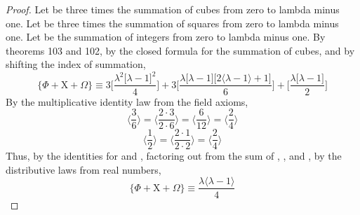 \documentclass[preview]{standalone}
\begin{document}
\begin{proof}
    Let \bm{$\Phi$} be three times the summation of cubes from zero to lambda minus one.
    Let  be three times the summation of squares from zero to lambda minus one.
    Let \bm{$\Omega$} be the summation of integers from zero to lambda minus one.
    By theorems 103 and 102, 
    by the closed formula for the summation of cubes,
    and by shifting the index of summation,
    \begin{equation*}
        \Bigg \{
            \Phi + \mathrm{X} + \Omega
        \Bigg \}
            \equiv
        3
        \Bigg[
            \frac{
                \lambda ^2
                \big[ \lambda - 1 \big] ^2
            }
            {4}
        \Bigg]
            +
        3
        \Bigg[
            \frac{
                \lambda 
                \big[ \lambda - 1 \big]
                \big[ 2 \langle \lambda - 1 \rangle + 1 \big]
            }
            {6}
        \Bigg]
            +
        \Bigg[
            \frac{\lambda \big [ \lambda - 1 ]}
            {2}
        \Bigg]
    \end{equation*} 
    By the multiplicative identity law from the field axioms,
    \begin{equation*}
        \bigg \langle 
            \frac{3}{6}
        \bigg \rangle
             = 
        \bigg \langle
            \frac{2 \cdot 3}{2 \cdot 6} 
        \bigg \rangle 
            = 
        \bigg \langle
            \frac{6}{12} 
        \bigg \rangle 
            = 
        \bigg \langle
            \frac{2}{4}
        \bigg \rangle
    \end{equation*}
    \begin{equation*}
        \bigg \langle 
            \frac{1}{2}
        \bigg \rangle
            =
        \bigg \langle
            \frac{2 \cdot 1}{2 \cdot 2}
        \bigg \rangle
            =
        \bigg \langle 
            \frac{2}{4}
        \bigg \rangle
    \end{equation*}
    Thus, by the identities for  and \bm{$\Omega$},
    factoring 
    out from the sum of \bm{$\Phi$}, , and \bm{$\Omega$},
    by the distributive laws from real numbers,
    \begin{equation*}
        \Bigg \{
            \Phi + \mathrm{X} + \Omega
        \Bigg \}
                \equiv
            \frac{
                \lambda \big \langle \lambda - 1 \big \rangle
            }
            {4}

\end{equation*}
\end{proof}
\end{document}
